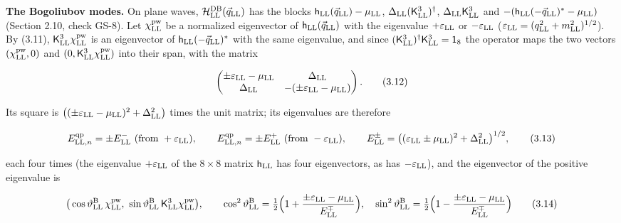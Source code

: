 \documentclass[
  10pt,
]{article}
\begin{document}
\textbf{The Bogoliubov modes.} On plane waves,
\(\mathcal H^{\rm DB}_{\rm LL}(\vec q_{\rm LL})\) has the blocks
\(\mathsf h_{\rm LL}(\vec q_{\rm LL})-\mu_{\rm LL}\),
\(\Delta_{\rm LL}(\mathsf K^3_{\rm LL})^\dagger\),
\(\Delta_{\rm LL}\mathsf K^3_{\rm LL}\) and
\(-(\mathsf h_{\rm LL}(-\vec q_{\rm LL})^*-\mu_{\rm LL})\) (Section
2.10, check GS-8). Let \(\chi^{\rm pw}_{\rm LL}\) be a normalized
eigenvector of \(\mathsf h_{\rm LL}(\vec q_{\rm LL})\) with the
eigenvalue \(+\varepsilon_{\rm LL}\) or \(-\varepsilon_{\rm LL}\)
(\(\varepsilon_{\rm LL}=(q_{\rm LL}^2+m_{\rm LL}^2)^{1/2}\)). By (3.11),
\(\mathsf K^3_{\rm LL}\chi^{\rm pw}_{\rm LL}\) is an eigenvector of
\(\mathsf h_{\rm LL}(-\vec q_{\rm LL})^*\) with the same eigenvalue, and
since \((\mathsf K^3_{\rm LL})^\dagger\mathsf K^3_{\rm LL}=\mathsf 1_8\)
the operator maps the two vectors \((\chi^{\rm pw}_{\rm LL},0)\) and
\((0,\mathsf K^3_{\rm LL}\chi^{\rm pw}_{\rm LL})\) into their span, with
the matrix

\[\begin{pmatrix}\pm\varepsilon_{\rm LL}-\mu_{\rm LL}&\Delta_{\rm LL}\\\Delta_{\rm LL}&-(\pm\varepsilon_{\rm LL}-\mu_{\rm LL})\end{pmatrix}.\tag{3.12}\]

Its square is
\(\big((\pm\varepsilon_{\rm LL}-\mu_{\rm LL})^2+\Delta_{\rm LL}^2\big)\)
times the unit matrix; its eigenvalues are therefore

\[E^{\rm qp}_{{\rm LL},n}=\pm E^-_{\rm LL}\ \text{(from }+\varepsilon_{\rm LL}),\qquad E^{\rm qp}_{{\rm LL},n}=\pm E^+_{\rm LL}\ \text{(from }-\varepsilon_{\rm LL}),\qquad E^\pm_{\rm LL}=\big((\varepsilon_{\rm LL}\pm\mu_{\rm LL})^2+\Delta_{\rm LL}^2\big)^{1/2},\tag{3.13}\]

each four times (the eigenvalue \(+\varepsilon_{\rm LL}\) of the
\(8\times8\) matrix \(\mathsf h_{\rm LL}\) has four eigenvectors, as has
\(-\varepsilon_{\rm LL}\)), and the eigenvector of the positive
eigenvalue is

\[\big(\cos\vartheta^{\rm B}_{\rm LL}\,\chi^{\rm pw}_{\rm LL},\ \sin\vartheta^{\rm B}_{\rm LL}\,\mathsf K^3_{\rm LL}\chi^{\rm pw}_{\rm LL}\big),\qquad\cos^2\vartheta^{\rm B}_{\rm LL}=\tfrac12\Big(1+\frac{\pm\varepsilon_{\rm LL}-\mu_{\rm LL}}{E^\mp_{\rm LL}}\Big),\quad\sin^2\vartheta^{\rm B}_{\rm LL}=\tfrac12\Big(1-\frac{\pm\varepsilon_{\rm LL}-\mu_{\rm LL}}{E^\mp_{\rm LL}}\Big)\tag{3.14}\]
\end{document}
